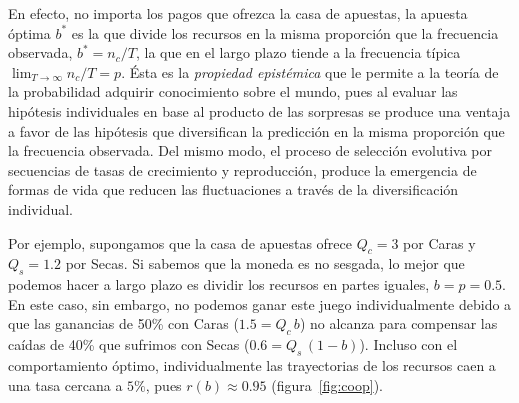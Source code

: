 \documentclass[a4paper,11pt]{book}
\theoremstyle{definition}
\begin{document}
\noindent
En efecto, no importa los pagos que ofrezca la casa de apuestas, la apuesta \'optima  $b^{*}$ es la que divide los recursos en la misma proporci\'on que la frecuencia observada, $b^{*} = n_c/T$, la que en el largo plazo tiende a la frecuencia t\'ipica $\lim_{T \rightarrow \infty} n_c/T = p$.
%
Ésta es la \emph{propiedad epist\'emica} que le permite a la teor\'ia de la probabilidad adquirir conocimiento sobre el mundo, pues al evaluar las hip\'otesis individuales en base al producto de las sorpresas se produce una ventaja a favor de las hip\'otesis que diversifican la predicci\'on en la misma proporci\'on que la frecuencia observada.
%
Del mismo modo, el proceso de selecci\'on evolutiva por secuencias de tasas de crecimiento y reproducci\'on, produce la emergencia de formas de vida que reducen las fluctuaciones a trav\'es de la diversificaci\'on individual.


Por ejemplo, supongamos que la casa de apuestas ofrece $Q_c = 3$ por Caras y $Q_s = 1.2$ por Secas.
%
Si sabemos que la moneda es no sesgada, lo mejor que podemos hacer a largo plazo es dividir los recursos en partes iguales, $b = p = 0.5$.
En este caso, sin embargo, no podemos ganar este juego individualmente debido a que las ganancias de 50\% con Caras ($1.5 = Q_c \, b$) no alcanza para compensar las ca\'idas de 40\% que sufrimos con Secas ($0.6 = Q_s \, (1-b)$).
%
Incluso con el comportamiento \'optimo, individualmente las trayectorias de los recursos caen a una tasa cercana a $5\%$, pues $r(b) \approx 0.95$ (figura~\ref{fig:coop}).

\end{document}
